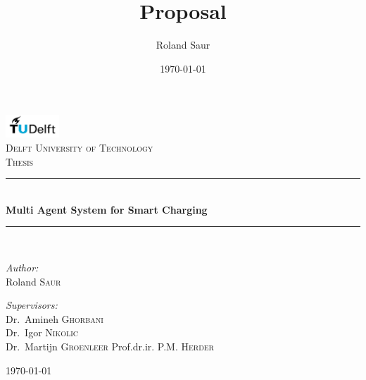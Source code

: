 \documentclass[a4paper]{article}
\title{Proposal}
\author{Roland Saur}
\date{\today}
\begin{document}
\begin{titlepage}

\begin{center}


\includegraphics[width=0.15\textwidth]{tud.png}\\[1cm]    

\textsc{\LARGE Delft University of Technology}\\[1.5cm]

\textsc{\Large Thesis}\\[0.5cm]


\newcommand{\HRule}{\rule{\linewidth}{0.5mm}}
\HRule \\[0.4cm]
{ \huge \bfseries Multi Agent System for Smart Charging}\\[0.4cm]

\HRule \\[1.5cm]

\begin{minipage}{0.4\textwidth}
\begin{flushleft} \large
\emph{Author:}\\
Roland \textsc{Saur}
\end{flushleft}
\end{minipage}
\hfill
\begin{minipage}{0.4\textwidth}
\begin{flushright} \large
\emph{Supervisors:} \\
Dr.~Amineh \textsc{Ghorbani} \\
Dr.~Igor \textsc{Nikolic} \\
Dr.~Martijn \textsc{Groenleer}
Prof.dr.ir. P.M. \textsc{Herder}  \\

\end{flushright}
\end{minipage}

\vfill

{\large \today}

\end{center}

\end{titlepage}
\newpage
\tableofcontents
\newpage
\listoffigures
\newpage
\end{document}

